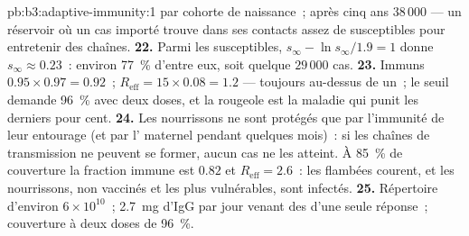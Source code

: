 \begin{solution}{pb:b3:adaptive-immunity:1}
par cohorte de naissance~; après cinq ans $38\,000$ --- un réservoir où
un cas importé trouve dans ses contacts assez de susceptibles pour
entretenir des chaînes.
\textbf{22.} Parmi les susceptibles, $s_{\infty} - \ln s_{\infty}/1.9 =
1$ donne $s_{\infty} \approx 0.23$~: environ \qty{77}{\%} d'entre eux,
soit quelque $29\,000$ cas.
\textbf{23.} Immuns $0.95\times 0.97 = 0.92$~; $R_{\text{eff}} = 15\times
0.08 = 1.2$ --- toujours au-dessus de un~; le seuil demande \qty{96}{\%}
avec deux doses, et la rougeole est la maladie qui punit les derniers
pour cent.
\textbf{24.} Les nourrissons ne sont protégés que par l'immunité de leur
entourage (et par l' maternel pendant quelques mois)~: si les
chaînes de transmission ne peuvent se former, aucun cas ne les atteint.
À \qty{85}{\%} de couverture la fraction immune est $0.82$ et
$R_{\text{eff}} = 2.6$~: les flambées courent, et les nourrissons, non
vaccinés et les plus vulnérables, sont infectés.
\textbf{25.} Répertoire d'environ $6\times 10^{10}$~; \qty{2.7}{mg} d'IgG
par jour venant des  d'une seule réponse~; couverture à deux
doses de \qty{96}{\%}.
\end{solution}
